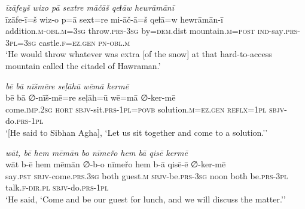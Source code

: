 \ea \label{DP.35}
\textit{īzāfeyš wizo pā sextre māčāš qeɫāw hewrāmānī} \\ 
\gll īzāfe-ī=š wiz-o p=ā sext=re mi-āč-ā=š qeɫā=w hewrāmān-ī \\ 
 addition\textsc{.m}\textsc{-obl}\textsc{.m}\textsc{=3sg} throw\textsc{.prs}\textsc{-3sg} by\textsc{=dem}.dist mountain\textsc{.m}\textsc{=\textsc{post}} \textsc{ind-}say\textsc{.prs}\textsc{-3pl}\textsc{=3sg} castle\textsc{\textsc{.f}}\textsc{=ez}\textsc{.gen} \textsc{pn}\textsc{-obl}\textsc{.m} \\ 
\glt `He would throw whatever was extra [of the snow] at that hard-to-access mountain called the citadel of Hawraman.'
\z 
 
\ea \label{DP.39}
\textit{bē bā nīšmēre seḷāhū wēmā kermē} \\ 
\gll bē bā ∅-nīš-mē=re seḷāh=ū wē=mā ∅-ker-mē \\ 
 come\textsc{.imp}\textsc{.\textsc{2sg}} \textsc{hort} \textsc{sbjv-}sit\textsc{.prs}\textsc{-1pl}\textsc{=\textsc{povb}} solution\textsc{.m}\textsc{=ez}\textsc{.gen} \textsc{reflx}\textsc{=1pl} \textsc{sbjv-}do\textsc{.prs}\textsc{-1pl} \\ 
\glt `[He said to Sibhan Agha], ‘Let us sit together and come to a solution.’'
\z 
 
\ea \label{DP.44}
\textit{wāt, bē hem mēmān bo nīmeřo hem bā qisē kermē} \\ 
\gll wāt b-ē hem mēmān ∅-b-o nīmeřo hem b-ā qisē-ē ∅-ker-mē \\ 
 say\textsc{.pst} \textsc{sbjv-}come\textsc{.prs}\textsc{.3sg} both guest\textsc{.m} \textsc{sbjv-}be\textsc{.prs}\textsc{-3sg} noon both be\textsc{.prs}\textsc{-3pl} talk\textsc{\textsc{.f}}\textsc{-dir}\textsc{.pl} \textsc{sbjv-}do\textsc{.prs}\textsc{-1pl} \\ 
\glt `He said, ‘Come and be our guest for lunch, and we will discuss the matter.’'
\z 
 

